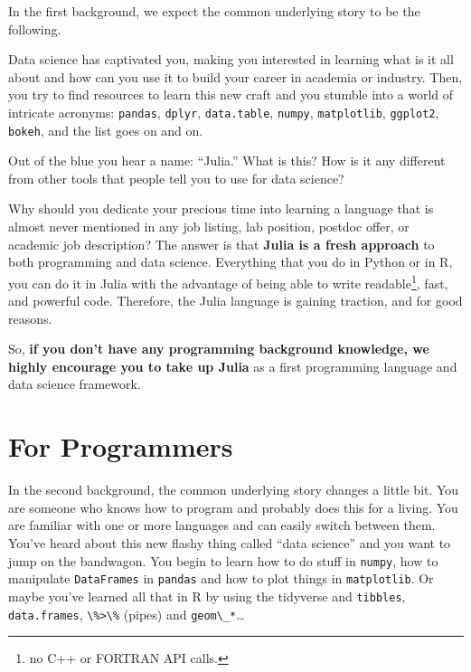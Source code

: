 \documentclass[
  notoc %
]{tufte-book}
\newcommand{\passthrough}[1]{#1}
\begin{document}
In the first background, we expect the common underlying story to be the
following.

Data science has captivated you, making you interested in learning what
is it all about and how can you use it to build your career in academia
or industry. Then, you try to find resources to learn this new craft and
you stumble into a world of intricate acronyms:
\passthrough{\lstinline!pandas!}, \passthrough{\lstinline!dplyr!},
\passthrough{\lstinline!data.table!}, \passthrough{\lstinline!numpy!},
\passthrough{\lstinline!matplotlib!}, \passthrough{\lstinline!ggplot2!},
\passthrough{\lstinline!bokeh!}, and the list goes on and on.

Out of the blue you hear a name: ``Julia.'' What is this? How is it any
different from other tools that people tell you to use for data science?

Why should you dedicate your precious time into learning a language that
is almost never mentioned in any job listing, lab position, postdoc
offer, or academic job description? The answer is that \textbf{Julia is
a fresh approach} to both programming and data science. Everything that
you do in Python or in R, you can do it in Julia with the advantage of
being able to write readable\footnote{no C++ or FORTRAN API calls.},
fast, and powerful code. Therefore, the Julia language is gaining
traction, and for good reasons.

So, \textbf{if you don't have any programming background knowledge, we
highly encourage you to take up Julia} as a first programming language
and data science framework.

\hypertarget{sec:programmers}{%
\section{For Programmers}\label{sec:programmers}}

In the second background, the common underlying story changes a little
bit. You are someone who knows how to program and probably does this for
a living. You are familiar with one or more languages and can easily
switch between them. You've heard about this new flashy thing called
``data science'' and you want to jump on the bandwagon. You begin to
learn how to do stuff in \passthrough{\lstinline!numpy!}, how to
manipulate \passthrough{\lstinline!DataFrames!} in
\passthrough{\lstinline!pandas!} and how to plot things in
\passthrough{\lstinline!matplotlib!}. Or maybe you've learned all that
in R by using the tidyverse and \passthrough{\lstinline!tibbles!},
\passthrough{\lstinline!data.frames!}, \passthrough{\lstinline!\%>\%!}
(pipes) and \passthrough{\lstinline!geom\_*!}\ldots{}
\end{document}
